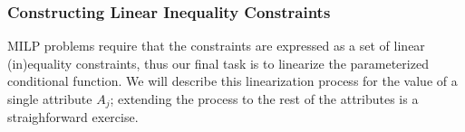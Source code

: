 



\subsubsection{Constructing Linear Inequality Constraints}
MILP problems require that the constraints are expressed as a set of linear
(in)equality constraints, thus our final task is to linearize the parameterized
conditional function.   We will describe this linearization process for the value 
of a single attribute $A_j$; extending the process to the rest of the attributes
is a straighforward exercise.

